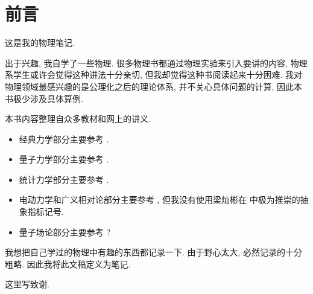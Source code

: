\section*{前言}
这是我的物理笔记. 

出于兴趣, 我自学了一些物理. 很多物理书都通过物理实验来引入要讲的内容, 物理系学生或许会觉得这种讲法十分亲切, 但我却觉得这种书阅读起来十分困难. 我对物理领域最感兴趣的是公理化之后的理论体系, 并不关心具体问题的计算, 因此本书极少涉及具体算例.

本书内容整理自众多教材和网上的讲义.
\begin{itemize}
    \item 经典力学部分主要参考 \cite{arnol2013mathematical}.
    \item 量子力学部分主要参考 \cite{griffiths_schroeter_2018,hall2013quantum}.
    \item 统计力学部分主要参考 \cite{sethna2021statistical}.
    \item 电动力学和广义相对论部分主要参考 \cite{梁灿彬2000微分几何入门与广义相对论}, 但我没有使用梁灿彬在 \cite{梁灿彬2000微分几何入门与广义相对论} 中极为推崇的抽象指标记号.
    \item 量子场论部分主要参考 \cite{lancaster2014quantum}?
\end{itemize}

我想把自己学过的物理中有趣的东西都记录一下. 由于野心太大, 必然记录的十分粗略. 因此我将此文稿定义为笔记.

这里写致谢.

\newpage

